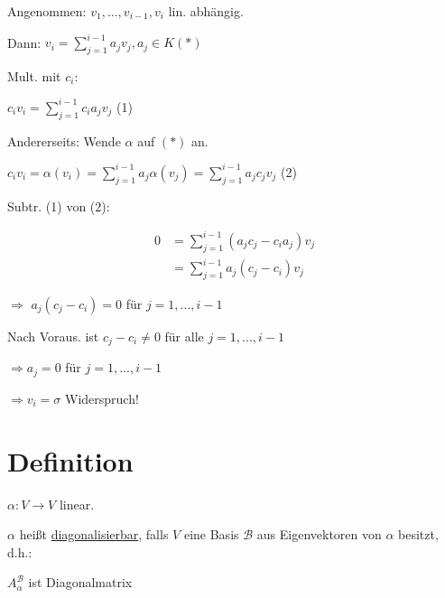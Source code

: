 \documentclass[a4paper, openany]{book}
\begin{document}
        Angenommen: $v_1, ..., v_{i-1}, v_i$ lin. abhängig.

        Dann: $v_i = \sum_{j=1}^{i-1} a_j v_j, a_j \in K (*)$

        Mult. mit $c_i$: 

        $c_i v_i = \sum_{j=1}^{i-1} c_i a_j v_j$ (1)

        \par \medskip

        Andererseits: Wende $\alpha$ auf $(*)$ an.

        \par \medskip

        $c_i v_i = \alpha(v_i) = \sum_{j=1}^{i-1} a_j \alpha(v_j) = \sum_{j=1}^{i-1} a_jc_jv_j$ (2)

        \par \medskip
        
        Subtr. (1) von (2):

        \begin{align*}
          0 & = \sum_{j=1}^{i-1} (a_jc_j - c_i a_j) v_j  \\
            & = \sum_{j=1}^{i-1} a_j (c_j- c_i)v_j 
        \end{align*}

        $\Rightarrow$ $a_j(c_j-c_i) = 0$ für $j=1, ..., i-1$

        \par \medskip

        \par \medskip

        Nach Voraus. ist $c_j - c_i \neq 0$ für alle $j=1, ..., i-1$

        $\Rightarrow a_j = 0$ für $j=1, ..., i-1$

        $\Rightarrow v_i = \sigma$ Widerspruch!

        \section{Definition}

        $\alpha : V \rightarrow V$ linear.

        $\alpha$ heißt \underline{diagonalisierbar}, falls $V$ eine Basis $\mathcal{B}$ aus Eigenvektoren von $\alpha$ besitzt, d.h.:

        \begin{center}
          $A_{\alpha}^{\mathcal{B}}$ ist Diagonalmatrix
        \end{center}
\end{document}
